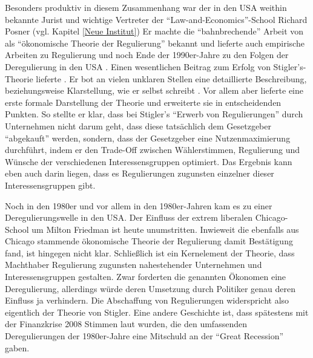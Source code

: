 Besonders produktiv in diesem Zusammenhang war der in den USA weithin bekannte Jurist und wichtige Vertreter der "`Law-and-Economics"'-School Richard Posner (vgl. Kapitel \ref{Neue Institut}) Er machte die "`bahnbrechende"' Arbeit von \textcite{Stigler1971} als "`ökonomische Theorie der Regulierung"' bekannt \parencite[S. 343]{Posner1974} und lieferte auch empirische Arbeiten \parencite{Posner1970, Posner1972a} zu Regulierung und noch Ende der 1990er-Jahre zu den Folgen der Deregulierung in den USA \parencite{Posner1999}. Einen wesentlichen Beitrag zum Erfolg von Stigler's-Theorie lieferte \textcite{Peltzman1976}. Er bot an vielen unklaren Stellen eine detaillierte Beschreibung, beziehungsweise Klarstellung, wie er selbst schreibt \parencite[S. 211]{Peltzman1976}. Vor allem aber lieferte eine erste formale Darstellung der Theorie und erweiterte sie in entscheidenden Punkten. So stellte er klar, dass bei Stigler's "`Erwerb von Regulierungen"' durch Unternehmen nicht darum geht, dass diese tatsächlich dem Gesetzgeber "`abgekauft"' werden, sondern, dass der Gesetzgeber eine Nutzenmaximierung durchführt, indem er den Trade-Off zwischen Wählerstimmen, Regulierung und Wünsche der verschiedenen Interessensgruppen optimiert. Das Ergebnis kann eben auch darin liegen, dass es Regulierungen zugunsten einzelner dieser Interessensgruppen gibt.

Noch in den 1980er und vor allem in den 1980er-Jahren kam es zu einer Deregulierungswelle in den USA. Der Einfluss der extrem liberalen Chicago-School um Milton Friedman ist heute unumstritten. Inwieweit die ebenfalls aus Chicago stammende ökonomische Theorie der Regulierung damit Bestätigung fand, ist hingegen nicht klar. Schließlich ist ein Kernelement der Theorie, dass Machthaber Regulierung zugunsten nahestehender Unternehmen und Interessensgruppen gestalten. Zwar forderten die genannten Ökonomen eine Deregulierung, allerdings würde deren Umsetzung durch Politiker genau deren Einfluss ja verhindern. Die Abschaffung von Regulierungen widerspricht also eigentlich der Theorie von Stigler. Eine andere Geschichte ist, dass spätestens mit der Finanzkrise 2008 Stimmen laut wurden, die den umfassenden Deregulierungen der 1980er-Jahre eine Mitschuld an der "`Great Recession"' gaben.

